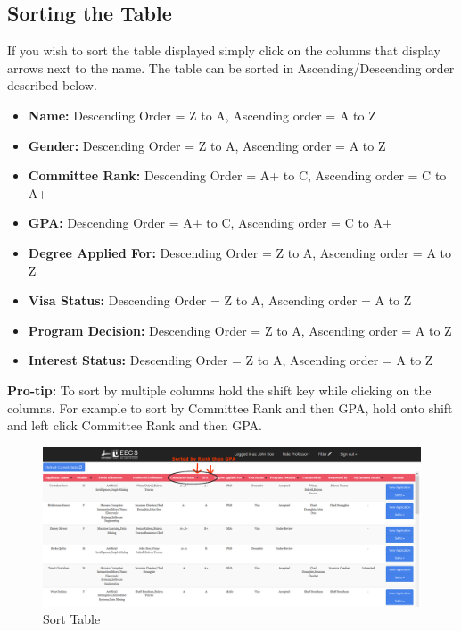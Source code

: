 \documentclass[fontsize=12pt,paper=letter,twoside]{scrartcl}
\begin{document}
\subsection{Sorting the Table}
If you wish to sort the table displayed simply click on the columns that display arrows next to the name. The table can be sorted in Ascending/Descending order described below.
\begin{itemize}
\item \textbf{Name:} Descending Order = Z to A, Ascending order = A to Z
\item \textbf{Gender:} Descending Order = Z to A, Ascending order = A to Z
\item \textbf{Committee Rank:} Descending Order = A+ to C, Ascending order = C to A+
\item \textbf{GPA:} Descending Order = A+ to C, Ascending order = C to A+
\item \textbf{Degree Applied For:} Descending Order = Z to A, Ascending order = A to Z
\item \textbf{Visa Status:} Descending Order = Z to A, Ascending order = A to Z
\item \textbf{Program Decision:} Descending Order = Z to A, Ascending order = A to Z
\item \textbf{Interest Status:} Descending Order = Z to A, Ascending order = A to Z
\end{itemize}
\textbf{Pro-tip:} To sort by multiple columns hold the shift key while clicking on the columns. For example to sort by Committee Rank and then GPA, hold onto shift and left click Committee Rank and then GPA.
\begin{figure}[!htb]
\begin{center}
\includegraphics[width=.99\textwidth]{images/prof/sorted_table.png}
\end{center}
\caption{Sort Table}
\label{fig:prof/sorted_table}
\end{figure}
\clearpage
\end{document}
